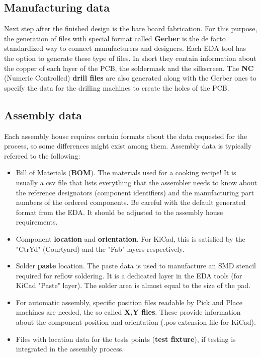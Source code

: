 \documentclass[12pt]{article}
\begin{document}
\subsection{Manufacturing data}

Next step after the finished design is the bare board fabrication. For this purpose, the generation of files with special format called \textbf{Gerber} is the de facto standardized way to connect manufacturers and designers. Each EDA tool has the option to generate these type of files. In short they contain information about the copper of each layer of the PCB, the soldermask and the silkscreen. The \textbf{NC} (Numeric Controlled) \textbf{drill files} are also generated along with the Gerber ones to specify the data for the drilling machines to create the holes of the PCB.


\subsection{Assembly data}

Each assembly house requires certain formats about the data requested for the process, so some differences might exist among them. Assembly data is typically referred to the following:

\begin{itemize}	
	\item Bill of Materials (\textbf{BOM}). The materials used for a cooking recipe! It is usually a csv file that lists everything that the assembler needs to know about the reference designators (component identifiers) and the manufacturing part numbers of the ordered components. Be careful with the default generated format from the EDA. It should be adjusted to the assembly house requirements.
	\item Component \textbf{location} and \textbf{orientation}. For KiCad, this is satisfied by the "CtrYd" (Courtyard) and the "Fab" layers respectively.
	\item Solder \textbf{paste} location. The paste data is used to manufacture an SMD stencil required for reflow soldering. It is a dedicated layer in the EDA tools (for KiCad "Paste" layer). The solder area is almost equal to the size of the pad.
	\item For automatic assembly, specific position files readable by Pick and Place machines are needed, the so called \textbf{X,Y files}. These provide information about the component position and orientation (.pos extension file for KiCad).
	\item Files with location data for the tests points (\textbf{test fixture}), if testing is integrated in the assembly process.
\end{itemize}
\end{document}
